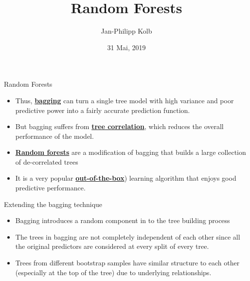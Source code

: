 \documentclass[
  10pt,
  ignorenonframetext,
]{beamer}
\title{Random Forests}
\author{Jan-Philipp Kolb}
\date{31 Mai, 2019}
\providecommand{\tightlist}{%
  \setlength{\itemsep}{0pt}\setlength{\parskip}{0pt}}
\begin{document}
\frame{\titlepage}

\begin{frame}{Random Forests}
\protect\hypertarget{random-forests}{}

\begin{itemize}
\tightlist
\item
  Thus,
  \href{https://en.wikipedia.org/wiki/Bootstrap_aggregating}{\textbf{bagging}}
  can turn a single tree model with high variance and poor predictive
  power into a fairly accurate prediction function.
\item
  But bagging suffers from
  \href{https://stats.stackexchange.com/questions/295868/why-is-tree-correlation-a-problem-when-working-with-bagging}{\textbf{tree
  correlation}}, which reduces the overall performance of the model.
\item
  \href{https://en.wikipedia.org/wiki/Random_forest}{\textbf{Random
  forests}} are a modification of bagging that builds a large collection
  of de-correlated trees
\item
  It is a very popular
  \href{https://en.wikipedia.org/wiki/Out_of_the_box_(feature)}{\textbf{out-of-the-box}})
  learning algorithm that enjoys good predictive performance.
\end{itemize}

\end{frame}

\begin{frame}{Extending the bagging technique}
\protect\hypertarget{extending-the-bagging-technique}{}

\begin{itemize}
\tightlist
\item
  Bagging introduces a random component in to the tree building process 
\item
  The trees in bagging are not completely independent of each other
  since all the original predictors are considered at every split of
  every tree.
\item
  Trees from different bootstrap samples have similar structure to each
  other (especially at the top of the tree) due to underlying
  relationships.
\end{itemize}

\end{frame}
\end{document}
